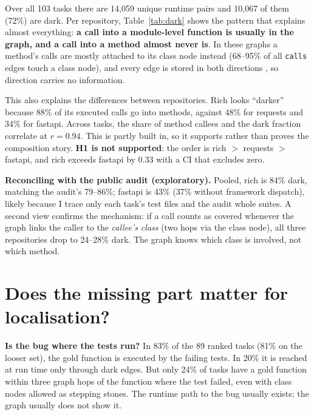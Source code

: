 \documentclass[11pt]{article}
\begin{document}
Over all 103 tasks there are 14{,}059 unique runtime pairs and 10{,}067 of them (72\%) are dark. Per repository, Table~\ref{tab:dark} shows the pattern that explains almost everything: \textbf{a call into a module-level function is usually in the graph, and a call into a method almost never is}. In these graphs a method's calls are mostly attached to its class node instead (68--95\% of all \texttt{calls} edges touch a class node), and every edge is stored in both directions \citep{akhil2026audit}, so direction carries no information.

This also explains the differences between repositories. Rich looks ``darker'' because 88\% of its executed calls go into methods, against 48\% for requests and 34\% for fastapi. Across tasks, the share of method callees and the dark fraction correlate at $r = 0.94$. This is partly built in, so it supports rather than proves the composition story. \textbf{H1 is not supported}: the order is rich $>$ requests $>$ fastapi, and rich exceeds fastapi by 0.33 with a CI that excludes zero.

\textbf{Reconciling with the public audit (exploratory).} Pooled, rich is 84\% dark, matching the audit's 79--86\%; fastapi is 43\% (37\% without framework dispatch), likely because I trace only each task's test files and the audit whole suites. A second view confirms the mechanism: if a call counts as covered whenever the graph links the caller to the \emph{callee's class} (two hops via the class node), all three repositories drop to 24--28\% dark. The graph knows which class is involved, not which method.

\section{Does the missing part matter for localisation?}\label{sec:loc}

\textbf{Is the bug where the tests run?} In 83\% of the 89 ranked tasks (81\% on the looser set), the gold function is executed by the failing tests. In 20\% it is reached at run time only through dark edges. But only 24\% of tasks have a gold function within three graph hops of the function where the test failed, even with class nodes allowed as stepping stones. The runtime path to the bug usually exists; the graph usually does not show it.
\end{document}
